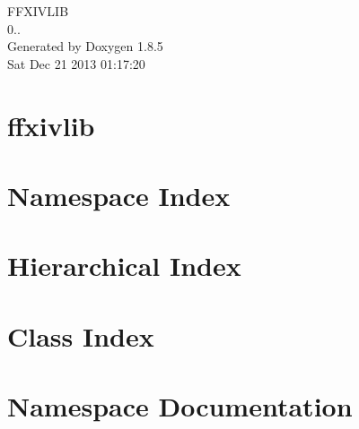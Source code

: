 \documentclass[twoside]{book}
\newcommand{\clearemptydoublepage}{%
  \newpage{\pagestyle{empty}\cleardoublepage}%
}
\begin{document}
\hypersetup{pageanchor=false}
\begin{titlepage}
\vspace*{7cm}
\begin{center}%
{\Large F\-F\-X\-I\-V\-L\-I\-B \\[1ex]\large 0.. }\\
\vspace*{1cm}
{\large Generated by Doxygen 1.8.5}\\
\vspace*{0.5cm}
{\small Sat Dec 21 2013 01:17:20}\\
\end{center}
\end{titlepage}
\clearemptydoublepage
\tableofcontents
\clearemptydoublepage
{}
\hypersetup{pageanchor=true}

\chapter{ffxivlib}
\label{md__r_e_a_d_m_e}
\hypertarget{md__r_e_a_d_m_e}{}

\chapter{Namespace Index}

\chapter{Hierarchical Index}

\chapter{Class Index}

\chapter{Namespace Documentation}


\end{document}
